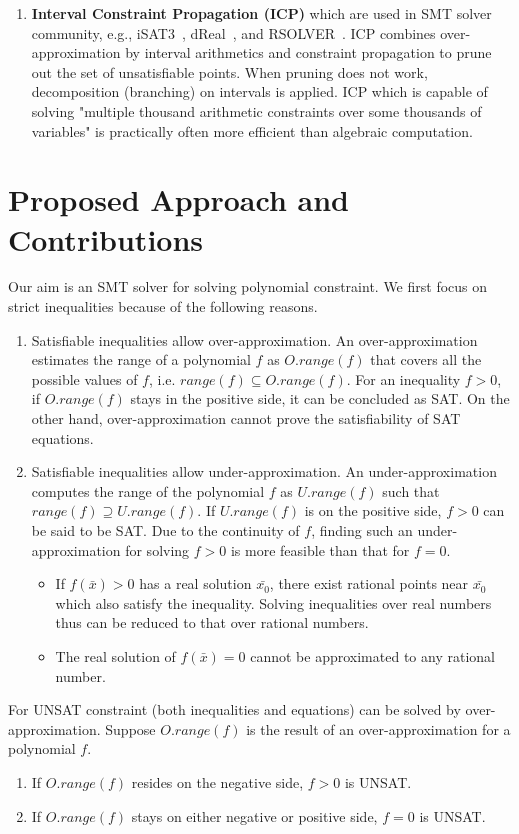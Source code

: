 \begin{enumerate}
\item \textbf{Interval Constraint Propagation (ICP)} 
which are used in SMT solver community, e.g., iSAT3~\cite{isat}, 
dReal~\cite{dRealCADE13}, and RSOLVER~\cite{rsolver}. 
ICP combines over-approximation by interval arithmetics and constraint propagation to prune out the set of unsatisfiable points. When pruning does not work, decomposition (branching) on intervals is applied. 
ICP which is capable of solving "multiple thousand arithmetic constraints over some thousands of variables" \cite{isat} is practically often more efficient than algebraic computation.
\end{enumerate}

\section{Proposed Approach and Contributions}
Our aim is an SMT solver for solving polynomial constraint. We first focus on strict inequalities because of the following reasons.
\begin{enumerate}
\item
Satisfiable inequalities allow over-approximation. An over-approximation estimates the range of a polynomial $f$ as $O.range(f)$ that covers all the possible values of $f$, i.e. $range(f) \subseteq O.range(f)$. For an inequality $f>0$, if $O.range(f)$ stays in the positive side, it can be concluded as SAT. On the other hand, over-approximation cannot prove the satisfiability of SAT equations.
\item
Satisfiable inequalities allow under-approximation. An under-approximation computes the range of the polynomial $f$ as  $U.range(f)$ such that $range(f) \supseteq U.range(f)$. If $U.range(f)$ is on the positive side, $f > 0$ can be said to be SAT. Due to the continuity of $f$, finding such an under-approximation for solving $f > 0$ is more feasible than that for $f = 0$.
\begin{itemize}
\item If $f(\bar{x}) > 0$ has a real solution $\bar{x_0}$, there exist rational points near $\bar{x_0}$ which also satisfy the inequality. Solving inequalities over real numbers thus can be reduced to that over rational numbers.
\item The real solution of $f(\bar{x}) = 0$ cannot be approximated to any rational number.
\end{itemize}
\end{enumerate}
For UNSAT constraint (both inequalities and equations) can be solved by over-approximation. Suppose $O.range(f)$ is the result of an over-approximation for a polynomial $f$.
\begin{enumerate}
\item If $O.range(f)$ resides on the negative side, $f > 0$ is UNSAT.
\item If $O.range(f)$ stays on either negative or positive side, $f = 0$ is UNSAT.
\end{enumerate}


